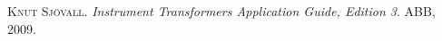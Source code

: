 \begin{thebibliography}{99}
     \textsc{Knut Sj\"{o}vall}. \textsl{Instrument Transformers Application Guide, Edition 3}.  ABB, 2009.

\end{thebibliography}
